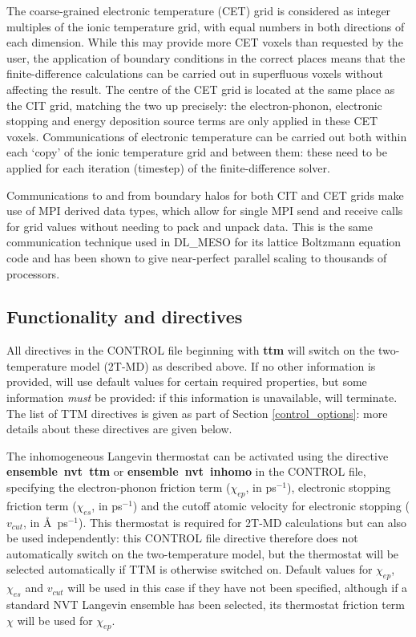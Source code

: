 The coarse-grained electronic temperature (CET) grid is considered as
integer multiples of the ionic temperature grid, with equal numbers in both
directions of each dimension. While this may provide more CET voxels than
requested by the user, the application of boundary conditions in the correct
places means that the finite-difference calculations can be carried out in
superfluous voxels without affecting the result. The centre of the CET grid is
located at the same place as the CIT grid, matching the two up precisely: the
electron-phonon, electronic stopping and energy deposition source terms are
only applied in these CET voxels. Communications of electronic temperature
can be carried out both within each `copy' of the ionic temperature grid and
between them: these need to be applied for each iteration (timestep) of the
finite-difference solver.

Communications to and from boundary halos for both CIT and CET grids
make use of MPI derived data types, which allow for single MPI send and
receive calls for grid values without needing to pack and unpack data. This
is the same communication technique used in DL\_MESO for its lattice
Boltzmann equation code\cite{seaton-13a} and has been shown to give
near-perfect parallel scaling to thousands of processors.

\subsection*{Functionality and directives}

All directives in the CONTROL file beginning with {\bf ttm} will switch on
the two-temperature model (2T-MD) as described above. If no other
information is provided, \D will use default values for certain required
properties, but some information {\em must} be provided: if this information
is unavailable, \D will terminate. The list of TTM directives is given as part of
Section \ref{control_options}: more details about these directives are given
below.

The inhomogeneous Langevin thermostat can be activated using the
directive {\bf ensemble~nvt~ttm} or {\bf \mbox{ensemble}~nvt~inhomo} in the
CONTROL file, specifying the electron-phonon friction term ($\chi_{ep}$,
in ps$^{-1}$), electronic stopping friction term ($\chi_{es}$, in ps$^{-1}$)
and the cutoff atomic velocity for electronic stopping ($v_{cut}$, in
\AA~ps$^{-1}$). This thermostat is required for 2T-MD calculations
but can also be used independently: this CONTROL file directive therefore
does not automatically switch on the two-temperature model, but the
thermostat will be selected automatically if TTM is otherwise switched on.
Default values for $\chi_{ep}$, $\chi_{es}$ and $v_{cut}$ will be used in this
case if they have not been specified, although if a standard NVT Langevin
ensemble has been selected, its thermostat friction term $\chi$ will be used
for $\chi_{ep}$.

